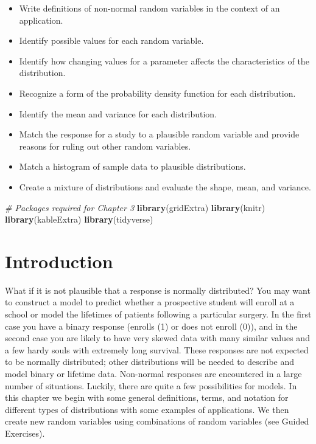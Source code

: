 \documentclass[
]{krantz}
\newenvironment{Shaded}{\begin{snugshade}}{\end{snugshade}}
\newcommand{\CommentTok}[1]{\textcolor[rgb]{0.37,0.37,0.37}{\textit{#1}}}
\newcommand{\FunctionTok}[1]{\textcolor[rgb]{0.27,0.27,0.27}{\textbf{#1}}}
\newcommand{\NormalTok}[1]{#1}
\providecommand{\tightlist}{%
  \setlength{\itemsep}{0pt}\setlength{\parskip}{0pt}}
\begin{document}
\begin{itemize}
\tightlist
\item
  Write definitions of non-normal random variables in the context of an application.
\item
  Identify possible values for each random variable.
\item
  Identify how changing values for a parameter affects the characteristics of the distribution.
\item
  Recognize a form of the probability density function for each distribution.
\item
  Identify the mean and variance for each distribution.
\item
  Match the response for a study to a plausible random variable and provide reasons for ruling out other random variables.
\item
  Match a histogram of sample data to plausible distributions.
\item
  Create a mixture of distributions and evaluate the shape, mean, and variance.
\end{itemize}

\begin{Shaded}
\begin{Highlighting}[]
\CommentTok{\# Packages required for Chapter 3}
\FunctionTok{library}\NormalTok{(gridExtra)  }
\FunctionTok{library}\NormalTok{(knitr) }
\FunctionTok{library}\NormalTok{(kableExtra)}
\FunctionTok{library}\NormalTok{(tidyverse)}
\end{Highlighting}
\end{Shaded}

\section{Introduction}\label{introduction}

What if it is not plausible that a response is normally distributed? You may want to construct a model to predict whether a prospective student will enroll at a school or model the lifetimes of patients following a particular surgery. In the first case you have a binary response (enrolls (1) or does not enroll (0)), and in the second case you are likely to have very skewed data with many similar values and a few hardy souls with extremely long survival. These responses are not expected to be normally distributed; other distributions will be needed to describe and model binary or lifetime data. Non-normal responses are encountered in a large number of situations. Luckily, there are quite a few possibilities for models. In this chapter we begin with some general definitions, terms, and notation for different types of distributions with some examples of applications. We then create new random variables using combinations of random variables (see Guided Exercises).
\end{document}
